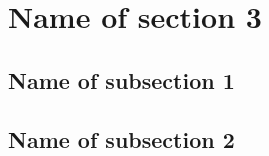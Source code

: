 \documentclass[../main.tex]{subfiles}
\begin{document}
    \lipsum[1]
    
    \section{Name of section 3}
    \lipsum[1]
    
    \subsection{Name of subsection 1}
    \lipsum[1]
    
    \subsection{Name of subsection 2}
    \lipsum[1]
    
\biblio
\cleardoublepage
\end{document}
